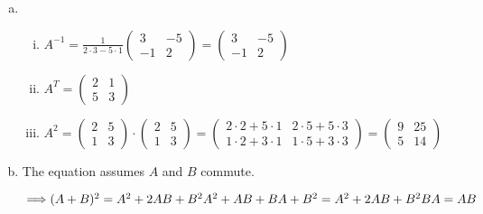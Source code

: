 \documentclass[10pt]{article}
\begin{document}
\begin{solution}

    \begin{enumerate}[(a)]

        \item {
            \begin{enumerate}[(i)]
                \item {
                    
                    $\displaystyle
                    A^{-1}
                    = \frac{1}{2 \cdot 3 - 5 \cdot 1} \begin{pmatrix} 3 & -5 \\ -1 & 2 \end{pmatrix}
                    = \begin{pmatrix} 3 & -5 \\ -1 & 2 \end{pmatrix}
                    $

                }
                \item {
                    $\displaystyle
                    A^{T}
                    = \begin{pmatrix} 2 & 1 \\ 5 & 3 \end{pmatrix}
                    $
                }
                \item {
                    $\displaystyle
                    A^2 
                    = \begin{pmatrix} 2 & 5 \\ 1 & 3 \end{pmatrix} \cdot \begin{pmatrix} 2 & 5 \\ 1 & 3 \end{pmatrix}
                    = \begin{pmatrix} 2 \cdot 2 + 5 \cdot 1 & 2 \cdot 5 + 5 \cdot 3 \\ 1 \cdot 2 + 3 \cdot 1 & 1 \cdot 5 + 3 \cdot 3 \end{pmatrix}
                    = \begin{pmatrix} 9 & 25 \\ 5 & 14 \end{pmatrix}
                    $
                }
            \end{enumerate}
        }
        \item {
            The equation assumes $A$ and $B$ commute. 
            
            $\implies \\
            (A+B)^2 = A^2 + 2AB + B^2 \\
            A^2 + AB + BA + B^2 = A^2 + 2AB + B^2 \\
            BA = AB
            $

}
\end{enumerate}
\end{solution}
\end{document}
